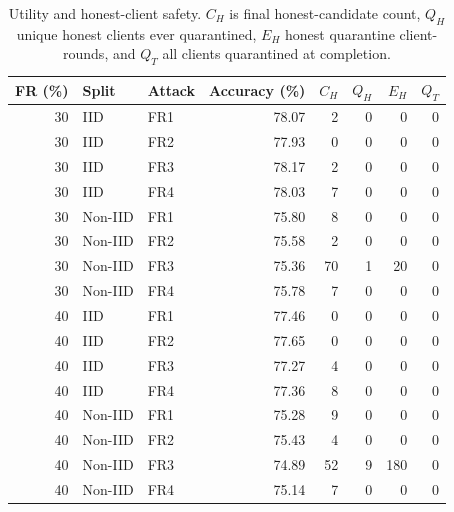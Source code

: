 \begin{table}[t]
\centering\footnotesize\setlength{\tabcolsep}{4pt}
\caption{Utility and honest-client safety. $C_H$ is final honest-candidate count, $Q_H$ unique honest clients ever quarantined, $E_H$ honest quarantine client-rounds, and $Q_T$ all clients quarantined at completion.}\label{tab:safety}
\begin{tabular}{rllrrrrr}
\toprule
FR (\%) & Split & Attack & Accuracy (\%) & $C_H$ & $Q_H$ & $E_H$ & $Q_T$ \\
\midrule
30 & IID & FR1 & 78.07 & 2 & 0 & 0 & 0 \\
30 & IID & FR2 & 77.93 & 0 & 0 & 0 & 0 \\
30 & IID & FR3 & 78.17 & 2 & 0 & 0 & 0 \\
30 & IID & FR4 & 78.03 & 7 & 0 & 0 & 0 \\
30 & Non-IID & FR1 & 75.80 & 8 & 0 & 0 & 0 \\
30 & Non-IID & FR2 & 75.58 & 2 & 0 & 0 & 0 \\
30 & Non-IID & FR3 & 75.36 & 70 & 1 & 20 & 0 \\
30 & Non-IID & FR4 & 75.78 & 7 & 0 & 0 & 0 \\
40 & IID & FR1 & 77.46 & 0 & 0 & 0 & 0 \\
40 & IID & FR2 & 77.65 & 0 & 0 & 0 & 0 \\
40 & IID & FR3 & 77.27 & 4 & 0 & 0 & 0 \\
40 & IID & FR4 & 77.36 & 8 & 0 & 0 & 0 \\
40 & Non-IID & FR1 & 75.28 & 9 & 0 & 0 & 0 \\
40 & Non-IID & FR2 & 75.43 & 4 & 0 & 0 & 0 \\
40 & Non-IID & FR3 & 74.89 & 52 & 9 & 180 & 0 \\
40 & Non-IID & FR4 & 75.14 & 7 & 0 & 0 & 0 \\
\bottomrule
\end{tabular}
\end{table}

